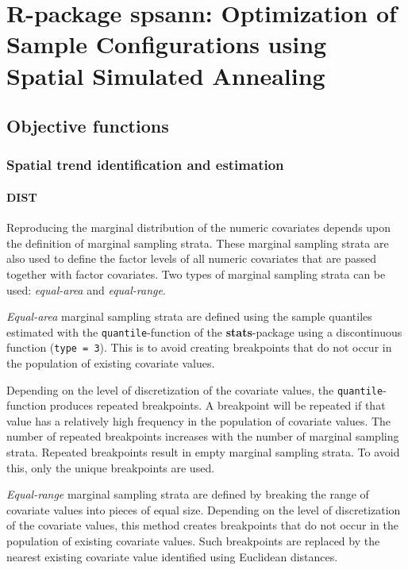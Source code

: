 \artigofalse
\chapter{R-package spsann: Optimization of Sample Configurations using Spatial 
Simulated Annealing}
\label{apen:spsann}

% 

\section{Objective functions}

\subsection{Spatial trend identification and estimation}

\subsubsection{DIST}

Reproducing the marginal distribution of the numeric covariates depends upon
the definition of marginal sampling strata. These marginal sampling strata 
are also used to define the factor levels of all numeric covariates that  
are passed together with factor covariates. Two types of marginal sampling 
strata can be used: \textit{equal-area} and \textit{equal-range}.

\textit{Equal-area} marginal sampling strata are defined using the sample 
quantiles estimated with the \texttt{quantile}-function of the 
\textbf{stats}-package using a discontinuous function (\texttt{type = 3}). This 
is to avoid creating breakpoints that do not occur in the population of 
existing covariate values.

Depending on the level of discretization of the covariate values, 
the \texttt{quantile}-function produces repeated breakpoints. A breakpoint 
will be repeated if that value has a relatively high frequency in the 
population of covariate values. The number of repeated breakpoints increases 
with the number of marginal sampling strata. Repeated breakpoints result in
empty marginal sampling strata. To avoid this, only the unique breakpoints 
are used.

\textit{Equal-range} marginal sampling strata are defined by breaking the range
of covariate values into pieces of equal size. Depending on the level of 
discretization of the covariate values, this method creates breakpoints that
do not occur in the population of existing covariate values. Such breakpoints
are replaced by the nearest existing covariate value identified using 
Euclidean distances.

